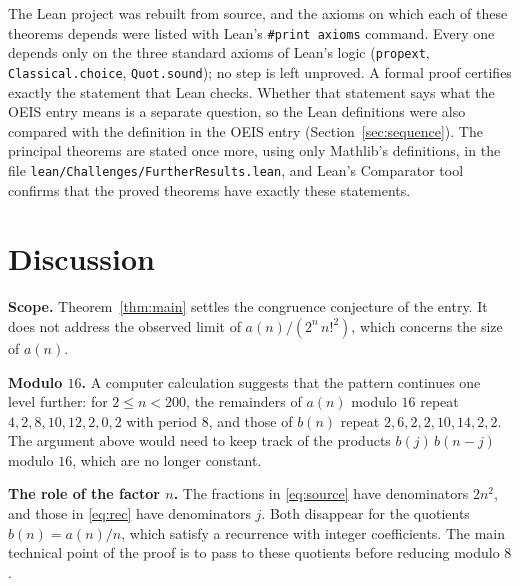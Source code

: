 \documentclass[11pt,a4paper]{article}
\theoremstyle{definition}
\theoremstyle{remark}
\newcommand{\para}[1]{\par\medskip\noindent\textbf{#1}\enspace}
\begin{document}
The Lean project was rebuilt from source, and the axioms on which each of these theorems depends were listed with
Lean's \texttt{\#print axioms} command. Every one depends only on the three standard axioms of Lean's logic
(\texttt{propext}, \texttt{Classical.choice}, \texttt{Quot.sound}); no step is left unproved. A formal proof certifies
exactly the statement that Lean checks. Whether that statement says what the OEIS entry means is a separate question,
so the Lean definitions were also compared with the definition in the OEIS entry
(Section~\ref{sec:sequence}). The principal theorems are stated once more, using only Mathlib's definitions, in the
file \texttt{lean/Challenges/FurtherResults.lean}, and Lean's Comparator tool confirms that the
proved theorems have exactly these statements.

\section{Discussion}\label{sec:discussion}

\para{Scope.} Theorem~\ref{thm:main} settles the congruence conjecture of the entry. It does not address the observed
limit of $a(n)/(2^n\,n!^2)$, which concerns the size of $a(n)$.

\para{Modulo $16$.} A computer calculation suggests that the pattern continues one level further: for $2\le n<200$, the
remainders of $a(n)$ modulo $16$ repeat $4,2,8,10,12,2,0,2$ with period $8$, and those of $b(n)$ repeat
$2,6,2,2,10,14,2,2$. The argument above would need to keep track of the products $b(j)\,b(n-j)$ modulo $16$, which are no
longer constant.

\para{The role of the factor $n$.} The fractions in \eqref{eq:source} have denominators $2n^2$, and those in
\eqref{eq:rec} have denominators $j$. Both disappear for the quotients $b(n)=a(n)/n$, which satisfy a recurrence with
integer coefficients. The main technical point of the proof is to pass to these quotients before reducing
modulo $8$.
\end{document}
